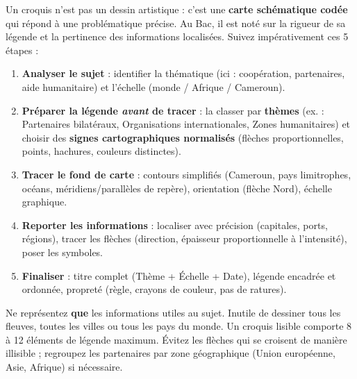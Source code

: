 \documentclass[11pt]{article}
\begin{document}
\begin{methode}
Un croquis n'est pas un dessin artistique : c'est une \textbf{carte schématique codée} qui répond à une problématique précise. Au Bac, il est noté sur la rigueur de sa légende et la pertinence des informations localisées. Suivez impérativement ces 5 étapes :
\begin{enumerate}
    \item \textbf{Analyser le sujet} : identifier la thématique (ici : coopération, partenaires, aide humanitaire) et l'échelle (monde / Afrique / Cameroun).
    \item \textbf{Préparer la légende \emph{avant} de tracer} : la classer par \textbf{thèmes} (ex. : Partenaires bilatéraux, Organisations internationales, Zones humanitaires) et choisir des \textbf{signes cartographiques normalisés} (flèches proportionnelles, points, hachures, couleurs distinctes).
    \item \textbf{Tracer le fond de carte} : contours simplifiés (Cameroun, pays limitrophes, océans, méridiens/parallèles de repère), orientation (flèche Nord), échelle graphique.
    \item \textbf{Reporter les informations} : localiser avec précision (capitales, ports, régions), tracer les flèches (direction, épaisseur proportionnelle à l'intensité), poser les symboles.
    \item \textbf{Finaliser} : titre complet (Thème + Échelle + Date), légende encadrée et ordonnée, propreté (règle, crayons de couleur, pas de ratures).
\end{enumerate}
\end{methode}

\begin{attention}
Ne représentez \textbf{que} les informations utiles au sujet. Inutile de dessiner tous les fleuves, toutes les villes ou tous les pays du monde. Un croquis lisible comporte 8 à 12 éléments de légende maximum. Évitez les flèches qui se croisent de manière illisible ; regroupez les partenaires par zone géographique (Union européenne, Asie, Afrique) si nécessaire.
\end{attention}
\end{document}
